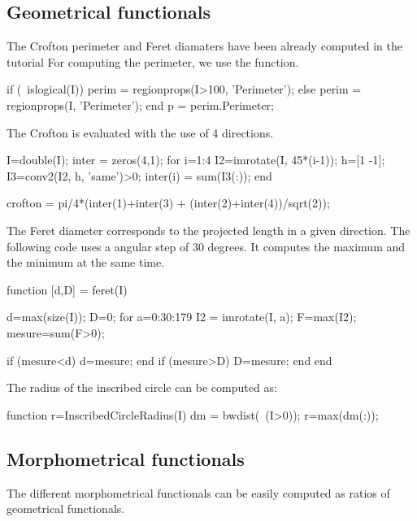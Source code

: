 \def\QRCODE{TB_IPR_TUT.IMG.shape_diagrams_matlabqrcode.png}
\def\QRPAGE{http://www.iptutorials.science/tree/master/TB_IPR/TUT.IMG.shape_diagrams/matlab}


\subsection{Geometrical functionals}
The Crofton perimeter and Feret diamaters have been already computed in the tutorial For computing the perimeter, we use the  function.

\begin{matlab}
if (~islogical(I))
    perim = regionprops(I>100, 'Perimeter');
else
    perim = regionprops(I, 'Perimeter');
end
p = perim.Perimeter;
\end{matlab}

The Crofton is evaluated with the use of 4 directions.
\begin{matlab}
I=double(I);
inter = zeros(4,1);
for i=1:4
    I2=imrotate(I, 45*(i-1));
    h=[1 -1];
    I3=conv2(I2, h, 'same')>0;
    inter(i) = sum(I3(:));
end

crofton = pi/4*(inter(1)+inter(3) + (inter(2)+inter(4))/sqrt(2));
\end{matlab}

The Feret diameter corresponds to the projected length in a given direction. The following code uses a angular step of 30 degrees. It computes the maximum and the minimum at the same time.
\begin{matlab}
function [d,D] = feret(I)

d=max(size(I));
D=0;
for a=0:30:179
    I2 = imrotate(I, a);
    F=max(I2);
    mesure=sum(F>0);
    
    if (mesure<d)
        d=mesure;
    end
    if (mesure>D)
        D=mesure;
    end
end
\end{matlab}

The radius of the inscribed circle can be computed as:
\begin{matlab}
function r=InscribedCircleRadius(I)
dm = bwdist(~(I>0));
r=max(dm(:));
\end{matlab}


\subsection{Morphometrical functionals}
The different morphometrical functionals can be easily computed as ratios of geometrical functionals.

